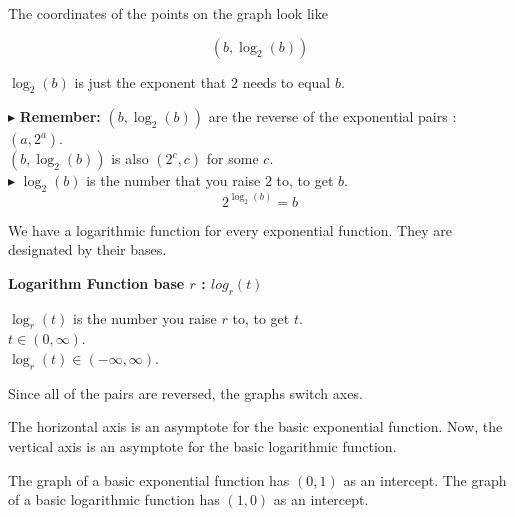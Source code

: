 \documentclass{ximera}
\begin{document}
The coordinates of the points on the graph look like



\[
(b, \log_2(b))
\]




$\log_2(b)$ is just the exponent that $2$ needs to equal $b$.





$\blacktriangleright$ \textbf{Remember:} $(b, \log_2(b))$ are the reverse of the exponential pairs : $(a, 2^a)$.  \\

$(b, \log_2(b))$ is also $(2^c, c)$ for some $c$. \\


$\blacktriangleright$  $\log_2(b)$ is the number that you raise $2$ to, to get $b$.  \\

\[   2^{\log_2(b)} = b     \]

We have a logarithmic function for every exponential function.  They are designated by their bases.
















\begin{definition} \textbf{\textcolor{green!50!black}{Logarithm Function base $r$ : $log_r(t)$}}


$\log_r(t)$ is the number you raise $r$ to, to get $t$. \\

$t \in (0, \infty)$. \\

$\log_r(t) \in (-\infty, \infty)$.


\end{definition}






Since all of the pairs are reversed, the graphs switch axes.



The horizontal axis is an asymptote for the basic exponential function. Now, the vertical axis is an asymptote for the basic logarithmic function.


The graph of a basic exponential function has $(0,1)$ as an intercept.  The graph of a basic logarithmic function has $(1,0)$ as an intercept. 
\end{document}
